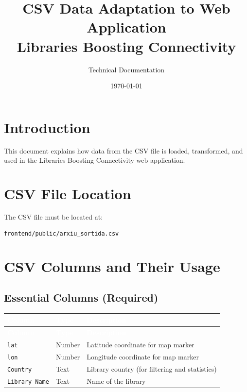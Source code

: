 \documentclass[11pt,a4paper]{article}
\title{\textbf{CSV Data Adaptation to Web Application}\\[0.5em]\large Libraries Boosting Connectivity}
\author{Technical Documentation}
\date{\today}
\begin{document}
\maketitle
\tableofcontents
\newpage

\section{Introduction}

This document explains how data from the CSV file is loaded, transformed, and used in the Libraries Boosting Connectivity web application.

\section{CSV File Location}

The CSV file must be located at:
\begin{lstlisting}
frontend/public/arxiu_sortida.csv
\end{lstlisting}

\section{CSV Columns and Their Usage}

\subsection{Essential Columns (Required)}

\begin{longtable}{|p{5cm}|p{2cm}|p{7cm}|}
\hline
\rowcolor{headerblue}\textcolor{white}{\textbf{Column}} & \textcolor{white}{\textbf{Type}} & \textcolor{white}{\textbf{Description}} \\
\hline
\endfirsthead
\hline
\rowcolor{headerblue}\textcolor{white}{\textbf{Column}} & \textcolor{white}{\textbf{Type}} & \textcolor{white}{\textbf{Description}} \\
\hline
\endhead
\texttt{lat} & Number & Latitude coordinate for map marker \\
\hline
\texttt{lon} & Number & Longitude coordinate for map marker \\
\hline
\texttt{Country} & Text & Library country (for filtering and statistics) \\
\hline
\texttt{Library Name} & Text & Name of the library \\
\hline
\end{longtable}
\end{document}
